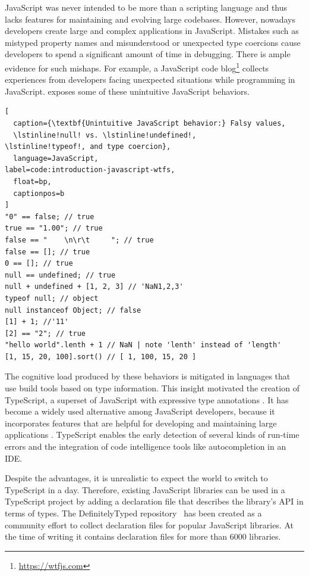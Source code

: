\documentclass[sigconf]{acmart}
\begin{document}
JavaScript was never intended to be more than a
scripting language and thus lacks features for maintaining and evolving large
codebases. However, nowadays developers create large and complex
applications in JavaScript. 
Mistakes such as mistyped property
names and misunderstood or unexpected type coercions cause developers
to spend a significant amount of time in debugging. There is ample
evidence for such mishaps. For example, a 
JavaScript code blog\footnote{\url{https://wtfjs.com}} collects experiences
from developers facing unexpected situations while programming in
JavaScript.  exposes some
of these unintuitive JavaScript behaviors. 

\begin{lstlisting}[
  caption={\textbf{Unintuitive JavaScript behavior:} Falsy values,
  \lstinline!null! vs. \lstinline!undefined!,
\lstinline!typeof!, and type coercion},
  language=JavaScript,
label=code:introduction-javascript-wtfs,
  float=bp,
  captionpos=b
]
"0" == false; // true
true == "1.00"; // true
false == "    \n\r\t     "; // true
false == []; // true
0 == []; // true
null == undefined; // true
null + undefined + [1, 2, 3] // 'NaN1,2,3' 
typeof null; // object
null instanceof Object; // false
[1] + 1; //'11'
[2] == "2"; // true
"hello world".lenth + 1 // NaN | note 'lenth' instead of 'length'
[1, 15, 20, 100].sort() // [ 1, 100, 15, 20 ]
\end{lstlisting}

The cognitive load produced by these behaviors is mitigated in languages that use
build tools based on type information. This insight motivated the
creation of TypeScript, a superset of JavaScript with expressive type
annotations \cite{typescript}. It has become a widely used alternative
among JavaScript developers, because it incorporates features that are
helpful for developing and maintaining large applications
\cite{DBLP:conf/icse/GaoBB17}. TypeScript enables the early detection
of several kinds of run-time errors and the integration of code intelligence
tools like autocompletion in an IDE.

Despite the advantages, it is unrealistic to expect the world to
switch to TypeScript in a day. Therefore, 
existing JavaScript libraries can be used in a TypeScript project by
adding a declaration file that describes the library's
API in terms of types. 
The DefinitelyTyped repository~\cite{definitely-typed-repository} has
been created as a community effort to collect declaration files for
popular JavaScript libraries. At the time of writing it contains
declaration files for more than 6000 libraries.
\end{document}

